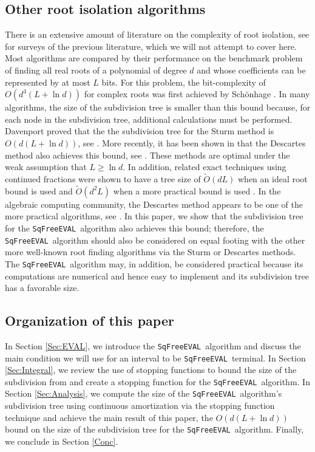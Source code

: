 \documentclass{amsart}
\theoremstyle{definition}
\newcommand{\EVAL}{\texttt{SqFreeEVAL}}
\begin{document}
\subsection{Other root isolation algorithms}\label{Intro:RootsFinding}
There is an extensive amount of literature on the complexity of root isolation, see \citep{pan:history-progress:97,Pan1996} for surveys of the previous literature, which we will not attempt to cover here.  Most algorithms are compared by their performance on the benchmark problem of finding all real roots of a polynomial of degree $d$ and whose coefficients can be represented by at most $L$ bits.  For this problem, the bit-complexity of $O(d^3(L+\ln d))$ for complex roots
was first achieved by Sch\"onhage \citep{schonhage:fundamental}.  In many algorithms, the size of the subdivision tree is smaller than this bound because, for each node in the subdivision tree, additional calculations must be performed.  Davenport \citep{davenport:85} proved that the the subdivision tree for the Sturm method is $O(d(L+\ln d))$, see \citep{reischert:subresultant:97,lickteig-roy:sequences:01,du-sharma-yap:sturm:07}.  More recently, it has been shown in \citep{eigenwillig-sharma-yap:descartes:06} that the Descartes method also achieves this bound, see \citep{collins-akritas:76,eigenwillig-sharma-yap:descartes:06,krandick-mehlhorn:06,collins-johnson-krandick:cad:02}.  These methods are optimal under the weak assumption that $L\geq\ln d$.  In addition, related exact techniques using continued fractions were shown to have a tree size of $\widetilde{O}(dL)$ when an ideal root bound is used and $\widetilde{O}(d^2L)$ when a more practical bound is used \citep{sharma:2008}. In the algebraic computing community, the Descartes method appears to be one of the more practical algorithms, see \citep{collins-johnson-krandick:cad:02,johnson:root-isolation:98,rouillier-zimmermann:roots:04,mrr:bernstein:05,rouillier-zimmermann:roots:04}.  In this paper, we show that the subdivision tree for the \EVAL\ algorithm also achieves this bound; therefore, the \EVAL\ algorithm should also be considered on equal footing with the other more well-known root finding algorithms via the Sturm or Descartes methods.  The \EVAL\ algorithm may, in addition, be considered practical because its computations are numerical and hence easy to implement and its subdivision tree has a favorable size.

\subsection{Organization of this paper}
In Section \ref{Sec:EVAL}, we introduce the \EVAL\ algorithm and discuss the main condition we will use for an interval to be \EVAL\ terminal.  In Section \ref{Sec:Integral}, we review the use of stopping functions to bound the size of the subdivision from \citep{Burr-Krahmer-Yap:integral:09} and create a stopping function for the \EVAL\ algorithm. In Section \ref{Sec:Analysis}, we compute the size of the \EVAL\ algorithm's subdivision tree using continuous amortization via the stopping function technique and achieve the main result of this paper, the $O(d(L+\ln d))$ bound on the size of the subdivision tree for the \EVAL\ algorithm.  Finally, we conclude in Section \ref{Conc}.
\end{document}
